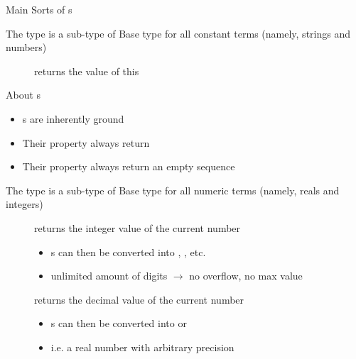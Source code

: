 \documentclass[handout]{beamer}
\begin{document}
\begin{frame}[allowframebreaks]{Main Sorts of s}
    \begin{block}{The  type is a sub-type of }\centering
        Base type for all constant terms (namely, strings and numbers)
    \end{block}
    \begin{description}
        \item[] returns the value of this 
    \end{description}

    \begin{alertblock}{About s}
        \begin{itemize}
            \item {}s are inherently \alert{ground}
            \item Their  property always return 
            \item Their  property always return an empty sequence
        \end{itemize}
    \end{alertblock}

    \framebreak

    \begin{block}{The  type is a sub-type of }\centering
        Base type for all numeric terms (namely, reals and integers)
    \end{block}
    \begin{description}
        \item[] returns the integer value of the current number
        \begin{itemize}
            \item {}s can then be converted into , , etc.
            \item unlimited amount of digits $\rightarrow$ no overflow, no max value
        \end{itemize}

        \item[] returns the decimal value of the current number
        \begin{itemize}
            \item {}s can then be converted into  or 
            \item i.e. a real number with arbitrary precision
        \end{itemize}
    \end{description}


\end{frame}
\end{document}
